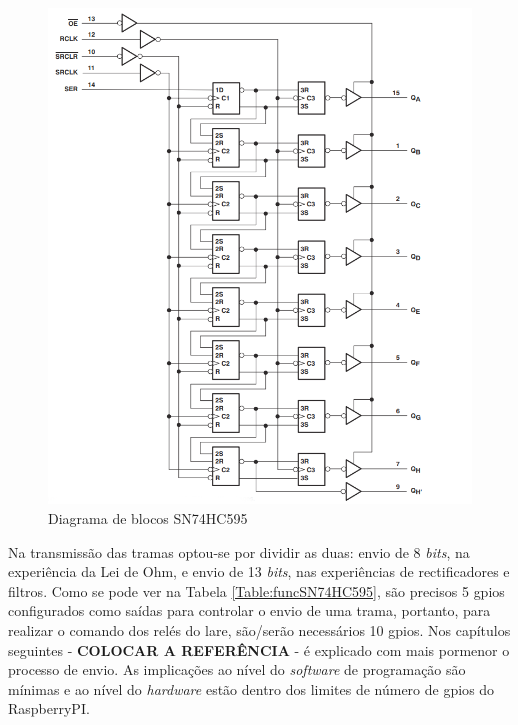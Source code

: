 \begin{figure}[hbtp]
	\centering
	\includegraphics[width=1\textwidth]{figures/SR_blocos.png}
	\caption{Diagrama de blocos SN74HC595 \cite{SN74HC595}}
	\label{fig:SN74HC595blocos}
\end{figure}

Na transmissão das tramas optou-se por dividir as duas: envio de 8 \textit{bits}, na experiência da Lei de Ohm, e envio de 13 \textit{bits}, nas experiências de rectificadores e filtros. Como se pode ver na Tabela \ref{Table:funcSN74HC595}, são precisos 5 \acrshort{gpio}s configurados como saídas para controlar o envio de uma trama, portanto, para realizar o comando dos relés do \acrshort{lare}, são/serão necessários 10 \acrshort{gpio}s.
Nos capítulos seguintes - \textbf{COLOCAR A REFERÊNCIA} - é explicado com mais pormenor o processo de envio. As implicações ao nível do \textit{software} de programação são mínimas e ao nível do \textit{hardware} estão dentro dos limites de número de \acrshort{gpio}s do \gls{RaspberryPI}.

